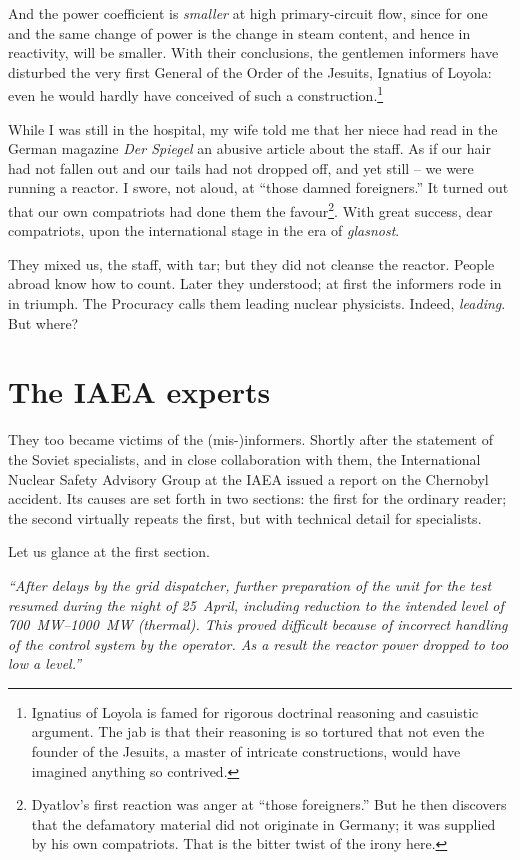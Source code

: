 \documentclass[openright]{bookest}
\begin{document}
And the power coefficient is \textit{smaller} at high primary-circuit flow, since for one and the same change of power is the change in steam content, and hence in reactivity, will be smaller. With their conclusions, the gentlemen informers have disturbed the very first General of the Order of the Jesuits, Ignatius of Loyola: even he would hardly have conceived of such a construction.\footnote{Ignatius of Loyola is famed for rigorous doctrinal reasoning and casuistic argument. The jab is that their reasoning is so tortured that not even the founder of the Jesuits, a master of intricate constructions, would have imagined anything so contrived.}

While I was still in the hospital, my wife told me that her niece had read in the German magazine \textit{Der Spiegel} an abusive article about the staff. As if our hair had not fallen out and our tails had not dropped off, and yet still -- we were running a reactor. I swore, not aloud, at ``those damned foreigners.'' It turned out that our own compatriots had done them the favour\footnote{Dyatlov's first reaction was anger at ``those foreigners.'' But he then discovers that the defamatory material did not originate in Germany; it was supplied by his own compatriots. That is the bitter twist of the irony here.}. With great success, dear compatriots, upon the international stage in the era of \textit{glasnost}.

They mixed us, the staff, with tar; but they did not cleanse the reactor. People abroad know how to count. Later they understood; at first the informers rode in in triumph. The Procuracy calls them leading nuclear physicists. Indeed, \textit{leading}. But where?

\section{The IAEA experts}

They too became victims of the (mis-)informers. Shortly after the statement of the Soviet specialists, and in close collaboration with them, the International Nuclear Safety Advisory Group at the IAEA issued a report on the Chernobyl accident. Its causes are set forth in two sections: the first for the ordinary reader; the second virtually repeats the first, but with technical detail for specialists.

Let us glance at the first section.

\begin{personal}
\textit{``After delays by the grid dispatcher, further preparation of the unit for the test resumed during the night of 25~April, including reduction to the intended level of \qtyrange{700}{1000}{\mega\watt} (thermal). This proved difficult because of incorrect handling of the control system by the operator. As a result the reactor power dropped to too low a level.''}
\end{personal}
\end{document}
